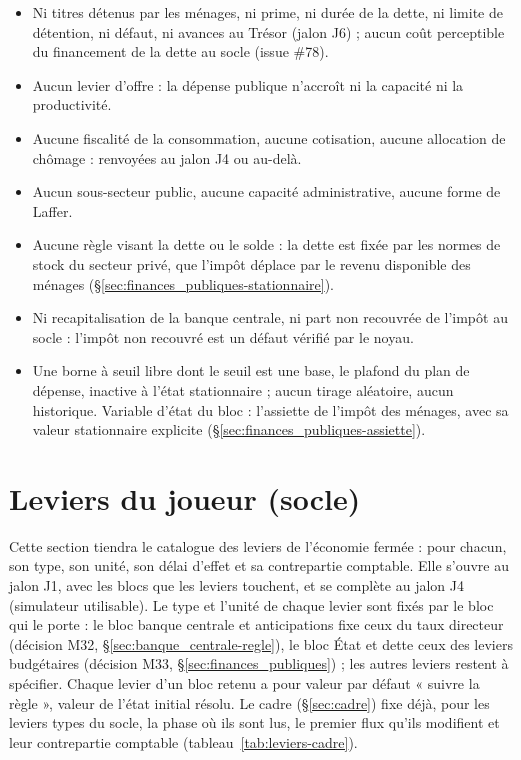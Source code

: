 \documentclass[11pt,a4paper]{article}
\begin{document}
\begin{portee}
\begin{itemize}
\item Ni titres détenus par les ménages, ni prime, ni durée de la dette, ni limite de détention, ni défaut, ni avances au Trésor (jalon J6) ; aucun coût perceptible du financement de la dette au socle (issue \#78).
\item Aucun levier d'offre : la dépense publique n'accroît ni la capacité ni la productivité.
\item Aucune fiscalité de la consommation, aucune cotisation, aucune allocation de chômage : renvoyées au jalon J4 ou au-delà.
\item Aucun sous-secteur public, aucune capacité administrative, aucune forme de Laffer.
\item Aucune règle visant la dette ou le solde : la dette est fixée par les normes de stock du secteur privé, que l'impôt déplace par le revenu disponible des ménages (\S\ref{sec:finances_publiques-stationnaire}).
\item Ni recapitalisation de la banque centrale, ni part non recouvrée de l'impôt au socle : l'impôt non recouvré est un défaut vérifié par le noyau.
\item Une borne à seuil libre dont le seuil est une base, le plafond du plan de dépense, inactive à l'état stationnaire ; aucun tirage aléatoire, aucun historique. Variable d'état du bloc : l'assiette de l'impôt des ménages, avec sa valeur stationnaire explicite (\S\ref{sec:finances_publiques-assiette}).
\end{itemize}
\end{portee}

\section{Leviers du joueur (socle)}
\label{sec:leviers}
Cette section tiendra le catalogue des leviers de l'économie fermée : pour chacun, son type, son unité, son délai d'effet et sa contrepartie comptable. Elle s'ouvre au jalon J1, avec les blocs que les leviers touchent, et se complète au jalon J4 (simulateur utilisable). Le type et l'unité de chaque levier sont fixés par le bloc qui le porte : le bloc banque centrale et anticipations fixe ceux du taux directeur (décision M32, \S\ref{sec:banque_centrale-regle}), le bloc État et dette ceux des leviers budgétaires (décision M33, \S\ref{sec:finances_publiques}) ; les autres leviers restent à spécifier. Chaque levier d'un bloc retenu a pour valeur par défaut « suivre la règle », valeur de l'état initial résolu. Le cadre (\S\ref{sec:cadre}) fixe déjà, pour les leviers types du socle, la phase où ils sont lus, le premier flux qu'ils modifient et leur contrepartie comptable (tableau~\ref{tab:leviers-cadre}).
\end{document}
